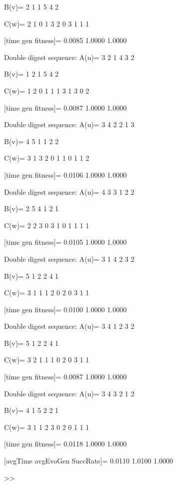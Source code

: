B(v)=
     2     1     1     5     4     2

C(w)=
     2     1     0     1     3     2     0     3     1     1     1

[time gen fitness]=
    0.0085    1.0000    1.0000

Double digest sequence:
A(u)=
     3     2     1     4     3     2

B(v)=
     1     2     1     5     4     2

C(w)=
     1     2     0     1     1     1     3     1     3     0     2

[time gen fitness]=
    0.0087    1.0000    1.0000

Double digest sequence:
A(u)=
     3     4     2     2     1     3

B(v)=
     4     5     1     1     2     2

C(w)=
     3     1     3     2     0     1     1     0     1     1     2

[time gen fitness]=
    0.0106    1.0000    1.0000

Double digest sequence:
A(u)=
     4     3     3     1     2     2

B(v)=
     2     5     4     1     2     1

C(w)=
     2     2     3     0     3     1     0     1     1     1     1

[time gen fitness]=
    0.0105    1.0000    1.0000

Double digest sequence:
A(u)=
     3     1     4     2     3     2

B(v)=
     5     1     2     2     4     1

C(w)=
     3     1     1     1     2     0     2     0     3     1     1

[time gen fitness]=
    0.0100    1.0000    1.0000

Double digest sequence:
A(u)=
     3     4     1     2     3     2

B(v)=
     5     1     2     2     4     1

C(w)=
     3     2     1     1     1     0     2     0     3     1     1

[time gen fitness]=
    0.0087    1.0000    1.0000

Double digest sequence:
A(u)=
     3     4     3     2     1     2

B(v)=
     4     1     5     2     2     1

C(w)=
     3     1     1     2     3     0     2     0     1     1     1

[time gen fitness]=
    0.0118    1.0000    1.0000

[avgTime  avgEvoGen  SuccRate]=
    0.0110    1.0100    1.0000

>> 